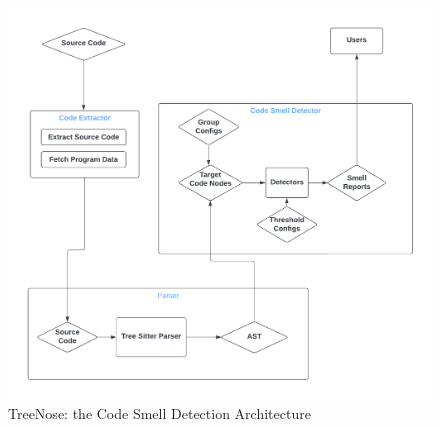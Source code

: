 %
%
%
\begin{figure}[t]
    \centering
    \includegraphics[width=\columnwidth]{graphics/Architecture.pdf}
    \caption{
        \label{fig:architecture}
        TreeNose: the Code Smell Detection Architecture 
    }
\end{figure}